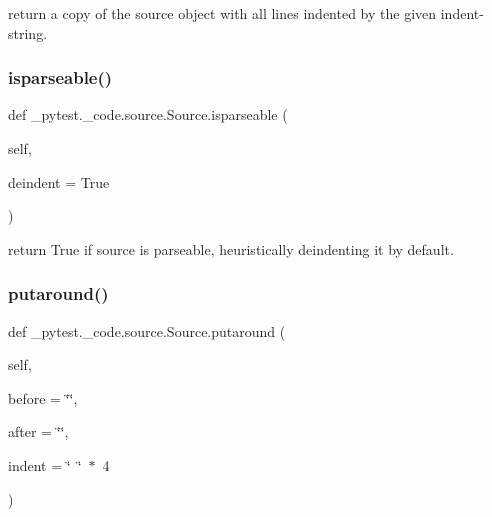 \begin{DoxyVerb}return a copy of the source object with
    all lines indented by the given indent-string.
\end{DoxyVerb}
 \mbox{\label{class__pytest_1_1__code_1_1source_1_1_source_a91c09b329d66eb3596c02a4641e4070c}} 
\subsubsection{\texorpdfstring{isparseable()}{isparseable()}}
{\footnotesize\ttfamily def \+\_\+pytest.\+\_\+code.\+source.\+Source.\+isparseable (\begin{DoxyParamCaption}\item[{}]{self,  }\item[{}]{deindent = {\ttfamily True} }\end{DoxyParamCaption})}

\begin{DoxyVerb}return True if source is parseable, heuristically
    deindenting it by default.
\end{DoxyVerb}
 \mbox{\label{class__pytest_1_1__code_1_1source_1_1_source_a6711d31f585b6d407ab89a5103201af1}} 
\subsubsection{\texorpdfstring{putaround()}{putaround()}}
{\footnotesize\ttfamily def \+\_\+pytest.\+\_\+code.\+source.\+Source.\+putaround (\begin{DoxyParamCaption}\item[{}]{self,  }\item[{}]{before = {\ttfamily \char`\"{}\char`\"{}},  }\item[{}]{after = {\ttfamily \char`\"{}\char`\"{}},  }\item[{}]{indent = {\ttfamily \char`\"{}~\char`\"{}~$\ast$~4} }\end{DoxyParamCaption})}

